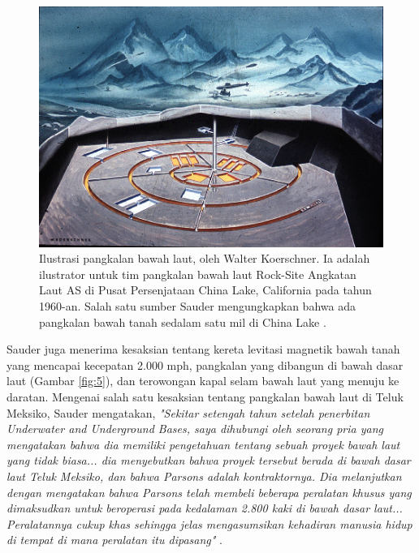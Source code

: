 \documentclass[10pt,twocolumn,letterpaper]{article}
\begin{document}
\begin{figure}[t]
\begin{center}
   \includegraphics[width=1\linewidth]{undersea.jpg}
\end{center}
   \caption{Ilustrasi pangkalan bawah laut, oleh Walter Koerschner. Ia adalah ilustrator untuk tim pangkalan bawah laut Rock-Site Angkatan Laut AS di Pusat Persenjataan China Lake, California pada tahun 1960-an. Salah satu sumber Sauder mengungkapkan bahwa ada pangkalan bawah tanah sedalam satu mil di China Lake \cite{22,23}.}
\label{fig:5}
\label{fig:onecol}
\end{figure}

Sauder juga menerima kesaksian tentang kereta levitasi magnetik bawah tanah yang mencapai kecepatan 2.000 mph, pangkalan yang dibangun di bawah dasar laut (Gambar \ref{fig:5}), dan terowongan kapal selam bawah laut yang menuju ke daratan. Mengenai salah satu kesaksian tentang pangkalan bawah laut di Teluk Meksiko, Sauder mengatakan, \textit{"Sekitar setengah tahun setelah penerbitan Underwater and Underground Bases, saya dihubungi oleh seorang pria yang mengatakan bahwa dia memiliki pengetahuan tentang sebuah proyek bawah laut yang tidak biasa... dia menyebutkan bahwa proyek tersebut berada di bawah dasar laut Teluk Meksiko, dan bahwa Parsons adalah kontraktornya. Dia melanjutkan dengan mengatakan bahwa Parsons telah membeli beberapa peralatan khusus yang dimaksudkan untuk beroperasi pada kedalaman 2.800 kaki di bawah dasar laut... Peralatannya cukup khas sehingga jelas mengasumsikan kehadiran manusia hidup di tempat di mana peralatan itu dipasang"} \cite{22}.
\end{document}
